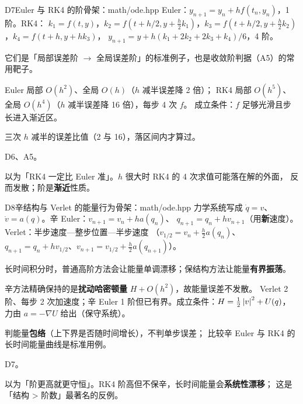 \begin{know}{D7}{Euler 与 RK4 的阶}{骨架：math/ode.hpp}
 Euler：$y_{n+1}=y_n+hf(t_n,y_n)$，1 阶。RK4：
$k_1=f(t,y)$，$k_2=f(t+h/2,y+\frac h2k_1)$，$k_3=f(t+h/2,y+\frac h2k_2)$，$k_4=f(t+h,y+hk_3)$，
$y_{n+1}=y+h(k_1+2k_2+2k_3+k_4)/6$，4 阶。

 它们是「局部误差阶 $\to$ 全局误差阶」的标准例子，也是收敛阶判据（A5）的常用靶子。

 Euler 局部 $O(h^{2})$、全局 $O(h)$（$h$ 减半误差降 2 倍）；
RK4 局部 $O(h^{5})$、全局 $O(h^{4})$（$h$ 减半误差降 16 倍），每步 4 次 $f$。
成立条件：$f$ 足够光滑且步长进入渐近区。

 三次 $h$ 减半的误差比值（2 与 16），落区间内才算过。

 D6、A5。

 以为「RK4 一定比 Euler 准」。$h$ 很大时 RK4 的 4 次求值可能落在解的外面，
反而发散；阶是\textbf{渐近}性质。
\end{know}

\begin{know}{D8}{辛结构与 Verlet 的能量行为}{骨架：math/ode.hpp}
 力学系统写成 $\dot q=v$、$\dot v=a(q)$。辛 Euler：$v_{n+1}=v_n+ha(q_n)$、
$q_{n+1}=q_n+hv_{n+1}$（用\textbf{新}速度）。Verlet：半步速度—整步位置—半步速度
（$v_{1/2}=v_n+\frac h2a(q_n)$、$q_{n+1}=q_n+hv_{1/2}$、$v_{n+1}=v_{1/2}+\frac h2a(q_{n+1})$）。

 长时间积分时，普通高阶方法会让能量单调漂移；保结构方法让能量\textbf{有界振荡}。

 辛方法精确保持的是\textbf{扰动哈密顿量} $H+O(h^{2})$，故能量误差不发散。
Verlet 2 阶、每步 2 次加速度；辛 Euler 1 阶但已有界。成立条件：$H=\frac12\left\lvert v\right\rvert^{2}+U(q)$，
力由 $a=-\nabla U$ 给出（保守系统）。

 判能量\textbf{包络}（上下界是否随时间增长），不判单步误差；
比较辛 Euler 与 RK4 的长时间能量曲线是标准用例。

 D7。

 以为「阶更高就更守恒」。RK4 阶高但不保辛，长时间能量会\textbf{系统性漂移}；
这是「结构 > 阶数」最著名的反例。
\end{know}
